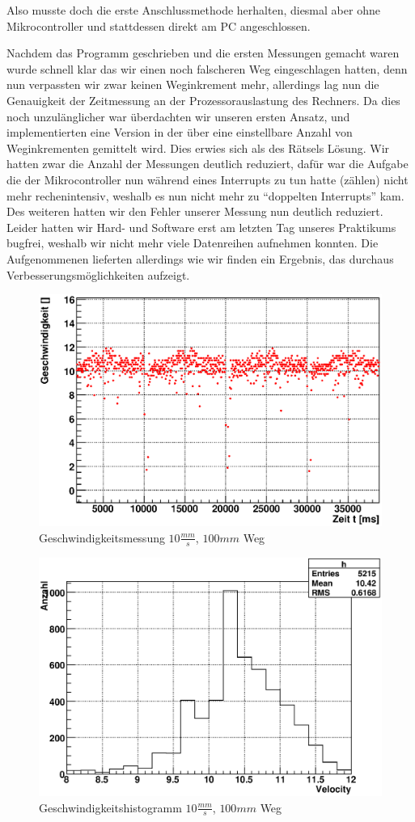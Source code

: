 \documentclass[12pt]{article}
\begin{document}
Also musste doch die erste Anschlussmethode herhalten, diesmal aber ohne Mikrocontroller und stattdessen direkt am PC angeschlossen.

Nachdem das Programm geschrieben und die ersten Messungen gemacht waren wurde schnell klar das wir einen noch falscheren Weg eingeschlagen hatten, denn nun verpassten wir zwar keinen Weginkrement mehr, allerdings 
lag nun die Genauigkeit der Zeitmessung an der Prozessorauslastung des Rechners. Da dies noch unzulänglicher war überdachten wir unseren ersten Ansatz, und implementierten eine Version in der über eine einstellbare Anzahl von Weginkrementen gemittelt wird.
Dies erwies sich als des Rätsels Lösung. Wir hatten zwar die Anzahl der Messungen deutlich reduziert, dafür war die Aufgabe die der Mikrocontroller nun während eines Interrupts zu tun hatte (zählen) nicht mehr rechenintensiv, weshalb es nun nicht mehr zu ``doppelten Interrupts'' kam.
Des weiteren hatten wir den Fehler unserer Messung nun deutlich reduziert. Leider hatten wir Hard- und Software erst am letzten Tag unseres Praktikums bugfrei, weshalb wir nicht mehr viele Datenreihen aufnehmen konnten. Die Aufgenommenen lieferten allerdings wie wir finden ein 
Ergebnis, das durchaus Verbesserungsmöglichkeiten aufzeigt.
\begin{figure}[H]
 \includegraphics[width=0.9\linewidth]{pictures/speed.eps}
 \caption{Geschwindigkeitsmessung $10\frac{mm}{s}$, $100mm$ Weg}
\end{figure}
\begin{figure}[H]
 \includegraphics[width=0.9\linewidth]{pictures/speed-histo.eps}
 \caption{Geschwindigkeitshistogramm $10\frac{mm}{s}$, $100mm$ Weg}
\end{figure}
\end{document}
